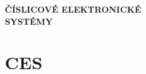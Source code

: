 \graphicspath{{../src/CES/img/}}

\begin{center}
  \vspace{1cm}
  \Huge \uppercase{\textbf{Číslicové elektronické}} \\
  \Huge \uppercase{\textbf{systémy}} \\
  \vspace{2cm}
\end{center}

\part{CES}\label{part:CES}
\parttoc
  
